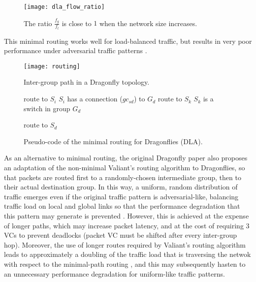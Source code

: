 \documentclass[review]{elsarticle}
\newcommand{\dflys}{Dragonflies}
\newcommand{\dfly}{Dragonfly}
\begin{document}
\begin{figure}[!htb]
	\centering
	\texttt{[image: dla\_flow\_ratio]}
	\caption{The ratio $\frac{f_g}{f_l}$ is close to $1$ when the network size increases.}
	\label{f:flow_ratio}
\end{figure}


This minimal routing works well for load-balanced traffic, but results in very poor performance under adversarial traffic patterns \cite{kim_technology-driven_2008}.

\begin{figure}[!tb]
	\centering
	\texttt{[image: routing]}
	\caption{Inter-group path in a \dfly{} topology.}
	\label{f:inter-group-path}
\end{figure}

\begin{figure}[!htb]
\begin{algorithmic}[0]
                \State route to $S_i$ \Comment $S_i$ has a connection ($gc_{sd}$) to $G_d$
                \State route to $S_k$ \Comment $S_k$ is a switch in group $G_d$

                \State route to $S_d$
       \EndIf
\end{algorithmic}
\caption{Pseudo-code of the minimal routing for \dflys{} (DLA).}
\label{f:dfly_ruting_alg}
\end{figure}

As an alternative to minimal routing, the original \dfly{} paper also proposes an adaptation of the non-minimal Valiant's routing algorithm \cite{valiant_1981} to \dflys{},
so that packets are routed first to a randomly-chosen intermediate group, then to their actual destination group.
In this way, a uniform, random distribution of traffic emerges even if the original traffic pattern is adversarial-like, balancing traffic load on local and global links
so that the performance degradation that this pattern may generate is prevented \cite{kim_technology-driven_2008}.
However, this is achieved at the expense of longer paths, which may increase packet latency, and at the cost of requiring $3$ VCs to prevent deadlocks (packet VC must be shifted after every inter-group hop).
Moreover, the use of longer routes required by Valiant's routing algorithm leads to approximately a doubling of the traffic load that is traversing the netwok with respect to the minimal-path routing \cite{dally_principles_2003, prisacari-hpdc2014},
and this may subsequently hasten to an unnecessary performance degradation for uniform-like traffic patterns.
\end{document}
